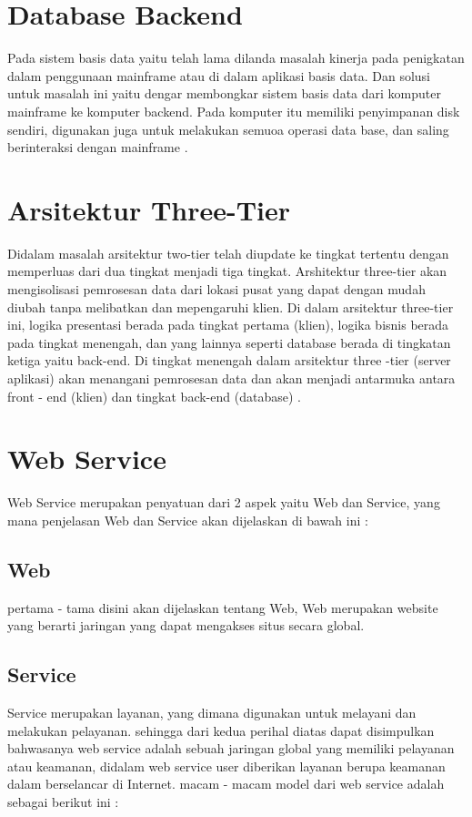 \section{Database Backend}
	Pada sistem basis data yaitu telah lama dilanda masalah kinerja pada penigkatan dalam penggunaan mainframe atau di dalam aplikasi basis data. Dan solusi untuk masalah ini yaitu dengar membongkar sistem basis data dari komputer mainframe ke komputer backend. Pada komputer itu memiliki penyimpanan disk sendiri, digunakan juga untuk melakukan semuoa operasi data base, dan saling berinteraksi dengan mainframe
\cite{yousefi2008database}.


\section{Arsitektur Three-Tier}
	Didalam masalah arsitektur two-tier telah diupdate ke tingkat tertentu dengan memperluas dari dua tingkat menjadi tiga tingkat.
Arshitektur three-tier akan mengisolisasi pemrosesan data dari lokasi pusat yang dapat dengan mudah diubah tanpa melibatkan dan mepengaruhi klien. Di dalam arsitektur three-tier ini, logika presentasi berada pada tingkat pertama (klien), logika bisnis berada pada 
tingkat menengah, dan yang lainnya seperti database berada di tingkatan ketiga yaitu back-end. Di tingkat menengah dalam
arsitektur three -tier (server aplikasi) akan menangani pemrosesan data dan akan menjadi antarmuka antara front - end (klien) dan
tingkat back-end (database)
\cite{demurjian1986multi}.


\section{Web Service}
	Web Service merupakan penyatuan dari 2 aspek yaitu Web dan Service, yang mana penjelasan Web dan Service akan dijelaskan di bawah ini :

\subsection{Web}
	pertama - tama disini akan dijelaskan tentang Web, Web merupakan website yang berarti 
jaringan yang dapat mengakses situs secara global.

\subsection{Service}
	Service merupakan layanan, yang dimana digunakan untuk melayani dan melakukan pelayanan.
sehingga dari kedua perihal diatas dapat disimpulkan bahwasanya web service adalah sebuah jaringan global yang memiliki pelayanan atau keamanan,
didalam web service user diberikan layanan berupa keamanan dalam berselancar di Internet. 
macam - macam model dari web service adalah sebagai berikut ini :

